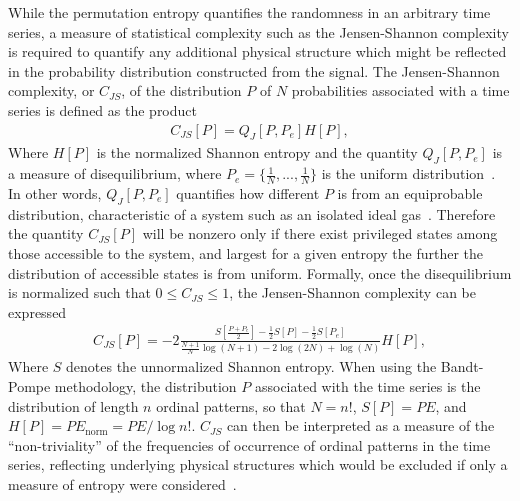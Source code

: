 \documentclass[aps,prx,twocolumn,secnumarabic,nobalancelastpage,amsmath,amssymb,
nofootinbib]{revtex4-1}
\begin{document}
While the permutation entropy quantifies the randomness in an arbitrary time series, a measure of statistical complexity such as the Jensen-Shannon complexity is required to quantify any additional physical structure which might be reflected in the probability distribution constructed from the signal. The Jensen-Shannon complexity, or $C_{JS}$, of the distribution $P$ of $N$ probabilities associated with a time series is defined as the product
\begin{align}
C_{JS}[P]=Q_J[P,P_e]H[P],
\end{align}
Where $H[P]$ is the normalized Shannon entropy and the quantity $ Q_J[P,P_e]$ is a measure of disequilibrium, where $P_e =\{\frac{1}{N}, ..., \frac{1}{N} \}$ is the uniform distribution~\cite{lamberti2004}. In other words, $ Q_J[P,P_e]$ quantifies how different $P$ is from an equiprobable distribution, characteristic of a system such as an isolated ideal gas~\cite{lopez1995}. Therefore the quantity $C_{JS}[P]$ will be nonzero only if there exist privileged states among those accessible to the system, and largest for a given entropy the further the distribution of accessible states is from uniform. Formally, once the disequilibrium is normalized such that $0 \leq C_{JS} \leq 1$, the Jensen-Shannon complexity can be expressed 
\begin{align}
C_{JS}[P]= -2\frac{S \left[ \frac{P+P_e}{2} \right] - \frac{1}{2}S[P]-\frac{1}{2}S[P_e] }{\frac{N+1}{N} \log(N+1)-2 \log(2N)+\log(N)} H[P],
\end{align}
Where $S$ denotes the unnormalized Shannon entropy. When using the Bandt-Pompe methodology, the distribution $P$ associated with the time series is the distribution of length $n$ ordinal patterns, so that $N=n!$, $S[P]=PE$, and $H[P] =PE_\text{norm}=PE/ \log n!$. $C_{JS}$ can then be interpreted as a measure of the “non-triviality” of the frequencies of occurrence of ordinal patterns in the time series, reflecting underlying physical structures which would be excluded if only a measure of entropy were considered~\cite{lamberti2004}.
\end{document}
